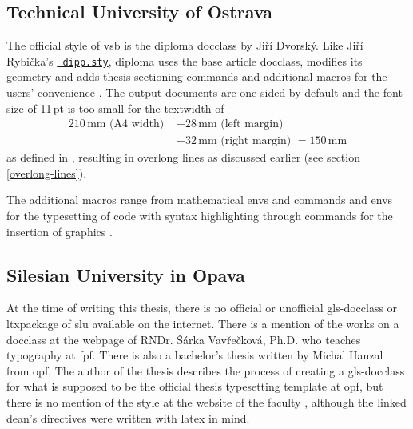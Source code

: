 \documentclass[12pt,twoside,cover,color,table]%
  {fithesis3/fithesis3/fithesis3} %
\begin{document}
  \subsection{Technical University of Ostrava}
  The official style of \gls{vsb} is the diploma \gls{docclass} by
  Jiří Dvorský. Like Jiří Rybička's \hyperref[sec:dipp.sty]{\tt
  dipp.sty}, diploma uses the base article \gls{docclass}, modifies
  its geometry and adds thesis sectioning commands and additional
  macros for the users' convenience \cite{diploma}. The output
  documents are one-sided by default and the font size of 11\,pt is
  too small for the \gls{textwidth} of \begin{equation}
    \begin{split}
      210\,\text{mm} \text{ (A4 width) }
        &- 28\,\text{mm} \text{ (left margin) }  \\
        &- 32\,\text{mm} \text{ (right margin) } = 150\,\text{mm}
    \end{split}
  \end{equation} as defined in
  \cite[lines~111,~123]{diplomaSource}, resulting in overlong lines
  as discussed earlier (see section \ref{overlong-lines}).

  The additional macros range from mathematical \glspl{env}
  \cite[section~3.5]{diploma} and commands and \glspl{env} for the
  typesetting of code with syntax highlighting
  \cite[section~3.6]{diploma}\pending{} through commands for the
  insertion of graphics \cite[section~3.7]{diploma}.

  \subsection{Silesian University in Opava}
  At the time of writing this thesis, there is no official or
  unofficial \gls{gls-docclass} or \gls{ltxpackage} of \gls{slu}
  available on the internet. There is a mention \cite{vavreckova}
  of the works on a \gls{docclass} at the webpage of RNDr. Šárka
  Vavřečková, Ph.D. who teaches typography at \acrlong{fpf}. There
  is also a bachelor's thesis \cite{hanzal09} written by Michal
  Hanzal from \gls{opf}. The author of the thesis describes the
  process of creating a \gls{gls-docclass} for what is supposed to
  be the official thesis typesetting template at \gls{opf}, but
  there is no mention of the style at the website of the faculty
  \cite{opftemplates}, although the linked dean's directives were
  written with \gls{latex} in mind.
\end{document}
